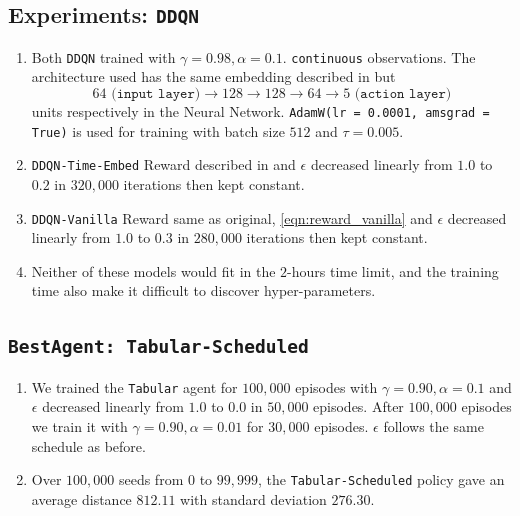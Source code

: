 \subsection{Experiments: \texttt{DDQN}}\label{sec:ddqn}
\begin{enumerate}
    \item Both \texttt{DDQN} trained with $\gamma = 0.98, \alpha = 0.1$. \texttt{continuous} observations. The architecture used has the same embedding described in  but $$64 \texttt{ (input layer)} \to 128 \to 128 \to 64 \to 5 \texttt{ (action layer)}$$ units  respectively in the Neural Network. \texttt{AdamW(lr = 0.0001, amsgrad = True)} is used for training with batch size $512$ and $\tau = 0.005$.

    
    \item \texttt{DDQN-Time-Embed} Reward described in  and $\epsilon$ decreased linearly from $1.0$ to $0.2$ in $320,000$ iterations then kept constant. 
    \item \texttt{DDQN-Vanilla} Reward same as original, \autoref{eqn:reward_vanilla} and $\epsilon$ decreased linearly from $1.0$ to $0.3$ in $280,000$ iterations then kept constant.

    \item Neither of these models would fit in the $2$-hours time limit, and the training time also make it difficult to discover hyper-parameters.
\end{enumerate}
\subsection{\texttt{BestAgent: Tabular-Scheduled}}
\begin{enumerate}
\item We trained the \texttt{Tabular} agent for $100,000$ episodes with $\gamma =  0.90, \alpha = 0.1$ and $\epsilon$ decreased linearly from $1.0$ to $0.0$ in $50,000$ episodes. After $100,000$ episodes we train it with $\gamma = 0.90, \alpha = 0.01$ for $30,000$ episodes. $\epsilon$ follows the same schedule as before.
\item Over $100,000$ seeds from $0$ to $99,999$, the \texttt{Tabular-Scheduled} policy gave an average distance $812.11$ with standard deviation $276.30$. 
\end{enumerate}